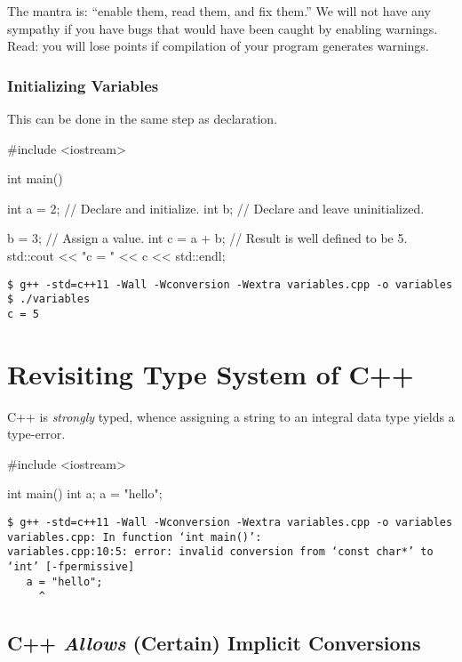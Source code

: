 \documentclass[12pt,letterpaper,twoside]{article}
\begin{document}
The mantra is: ``enable them, read them, and fix them.''
We will not have any sympathy if you have bugs that would have been
caught by enabling warnings. Read:
you will lose points if compilation of your program generates
warnings.

\subsubsection{Initializing Variables}
This can be done in the same step as declaration.
\begin{cpp}
#include <iostream>

int main() {
  int a = 2;         // Declare and initialize.
  int b;             // Declare and leave uninitialized.

  b = 3;             // Assign a value.
  int c = a + b;     // Result is well defined to be 5.
  std::cout << "c = " << c << std::endl;
}
\end{cpp}

\begin{verbatim}
$ g++ -std=c++11 -Wall -Wconversion -Wextra variables.cpp -o variables
$ ./variables 
c = 5
\end{verbatim}

\section{Revisiting Type System of C++}
C++ is \emph{strongly} typed, whence assigning a string to
an integral data type yields a type-error.
\begin{cpp}
#include <iostream>

int main() {
  int a;
  a = "hello";
}
\end{cpp}

{\footnotesize
\begin{verbatim}
$ g++ -std=c++11 -Wall -Wconversion -Wextra variables.cpp -o variables
variables.cpp: In function ‘int main()’:
variables.cpp:10:5: error: invalid conversion from ‘const char*’ to ‘int’ [-fpermissive]
   a = "hello";
     ^
\end{verbatim}
}

\subsection{C++ \emph{Allows} (Certain) Implicit Conversions}
\end{document}
